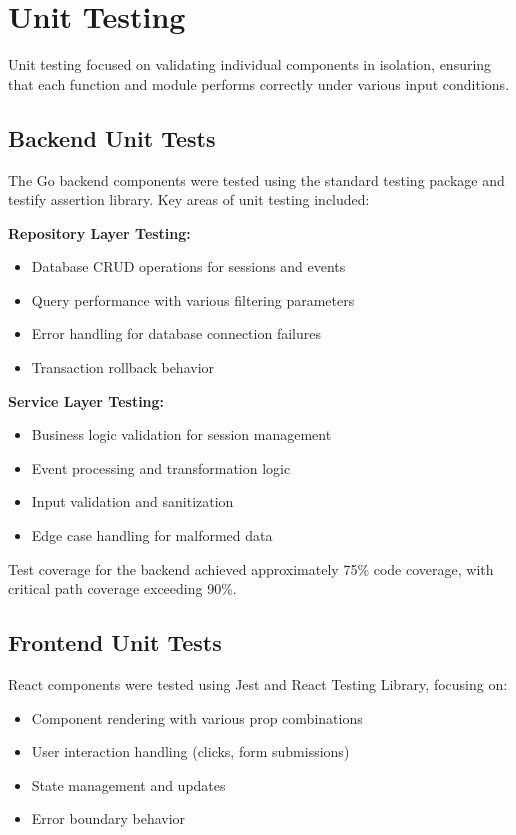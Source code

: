 \section{Unit Testing}

Unit testing focused on validating individual components in isolation, ensuring that each function and module performs correctly under various input conditions.

\subsection{Backend Unit Tests}

The Go backend components were tested using the standard testing package and testify assertion library. Key areas of unit testing included:

\textbf{Repository Layer Testing:}
\begin{itemize}
    \item Database CRUD operations for sessions and events
    \item Query performance with various filtering parameters
    \item Error handling for database connection failures
    \item Transaction rollback behavior
\end{itemize}

\textbf{Service Layer Testing:}
\begin{itemize}
    \item Business logic validation for session management
    \item Event processing and transformation logic
    \item Input validation and sanitization
    \item Edge case handling for malformed data
\end{itemize}

Test coverage for the backend achieved approximately 75\% code coverage, with critical path coverage exceeding 90\%.

\subsection{Frontend Unit Tests}

React components were tested using Jest and React Testing Library, focusing on:

\begin{itemize}
    \item Component rendering with various prop combinations
    \item User interaction handling (clicks, form submissions)
    \item State management and updates
    \item Error boundary behavior
\end{itemize}

